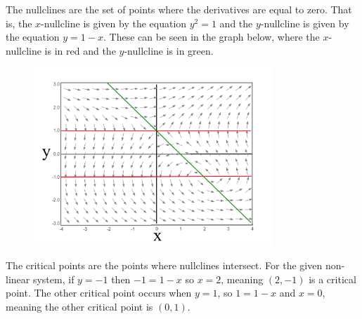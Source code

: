 \documentclass[11pt, titlepage]{article}
\begin{document}
\begin{enumerate}
        \begin{solution}
            The nullclines are the set of points where the derivatives are equal to zero.
            That is, the $x$-nullcline is given by the equation $y^2 = 1$ and the $y$-nullcline is given by the equation $y = 1 - x$.
            These can be seen in the graph below, where the $x$-nullcline is in red and the $y$-nullcline is in green.
            \begin{figure}[H]
                \centering
                \includegraphics[width=0.8\textwidth]{media/slopeField.png}
            \end{figure}

            The critical points are the points where nullclines intersect. For the given non-linear system, if $y = -1$ then $-1 = 1 - x$ so $x = 2$, meaning $(2, -1)$ is a critical point.
            The other critical point occurs when $y = 1$, so $1 = 1 - x$ and $x = 0$, meaning the other critical point is $(0, 1)$.


\end{solution}
\end{enumerate}
\end{document}
